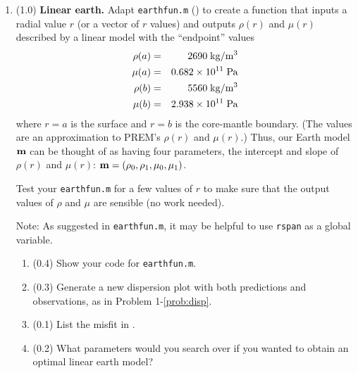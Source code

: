 \documentclass[11pt,titlepage,fleqn]{article}
\begin{document}
\begin{enumerate}
\label{prob:earth_homo}


\item (1.0) {\bf Linear earth.} Adapt \verb+earthfun.m+ () to create a function that inputs a radial value $r$ (or a vector of $r$ values) and outputs $\rho(r)$ and $\mu(r)$ described by a linear model with the ``endpoint'' values
%
\begin{eqnarray*}
\rho(a) &=& 2690 \; {\rm kg/m^3}
\\
\mu(a) &=& 0.682 \times 10^{11} \; {\rm Pa}
\\
\rho(b) &=& 5560 \; {\rm kg/m^3}
\\
\mu(b) &=& 2.938 \times 10^{11} \; {\rm Pa}
\end{eqnarray*}
%
where $r=a$ is the surface and $r=b$ is the core-mantle boundary. (The values are an approximation to PREM's $\rho(r)$ and $\mu(r)$.) Thus, our Earth model $\mbox{${\bf m}$}$ can be thought of as having four parameters, the intercept and slope of $\rho(r)$ and $\mu(r)$: $\mbox{${\bf m}$} = (\rho_0,\rho_1,\mu_0,\mu_1)$.

Test your \verb+earthfun.m+ for a few values of $r$ to make sure that the output values of $\rho$ and $\mu$ are sensible (no work needed).

Note: As suggested in \verb+earthfun.m+, it may be helpful to use \verb+rspan+ as a global variable.

\begin{enumerate}
\item (0.4) Show your code for \verb+earthfun.m+.
\item (0.3) Generate a new dispersion plot with both predictions and observations, as in Problem 1-\ref{prob:disp}.
\item (0.1) List the misfit in .
\item (0.2) What parameters would you search over if you wanted to obtain an optimal linear earth model?
\end{enumerate}

\label{prob:earth_linear}



\end{enumerate}
\end{document}
